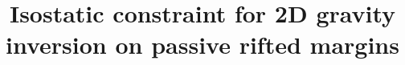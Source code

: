 \documentclass[manuscript]{geophysics}
\begin{document}
\title{Isostatic constraint for 2D gravity inversion on passive rifted margins}

\renewcommand{\thefootnote}{\fnsymbol{footnote}} 




\maketitle

%
%
%
\end{document}
